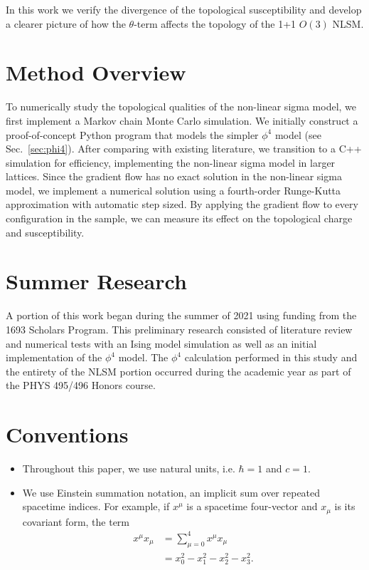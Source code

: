 In this work we verify the divergence of the topological susceptibility and develop a clearer picture of how the $\theta$-term affects the topology of the 1+1 $O(3)$ NLSM.


\section{Method Overview}

To numerically study the topological qualities of the non-linear sigma model, we first implement a Markov chain Monte Carlo simulation. We initially construct a proof-of-concept Python program that models the simpler $\phi^4$ model (see Sec.~\ref{sec:phi4}). After comparing with existing literature, we transition to a C++ simulation for efficiency, implementing the non-linear sigma model in larger lattices. Since the gradient flow has no exact solution in the non-linear sigma model, we implement a numerical solution using a fourth-order Runge-Kutta approximation with automatic step sized. By applying the gradient flow to every configuration in the sample, we can measure its effect on the topological charge and susceptibility.

\section{Summer Research}

A portion of this work began during the summer of 2021 using funding from the 1693 Scholars Program. This preliminary research consisted of literature review and numerical tests with an Ising model simulation as well as an initial implementation of the $\phi^4$ model. The $\phi^4$ calculation performed in this study and the entirety of the NLSM portion occurred during the academic year as part of the PHYS 495/496 Honors course.


\section{Conventions}
\begin{itemize}
    \item Throughout this paper, we use natural units, i.e. $\hbar = 1$ and $c=1$.
    \item We use Einstein summation notation, an implicit sum over repeated spacetime indices. For example, if $x^\mu$ is a spacetime four-vector and $x_\mu$ is its covariant form, the term
        \begin{align*}
            x^\mu x_\mu &= \sum^4_{\mu=0} x^\mu x_\mu \\
            &= x_0^2-x_1^2-x_2^2-x_3^2.
        \end{align*}
\end{itemize}

